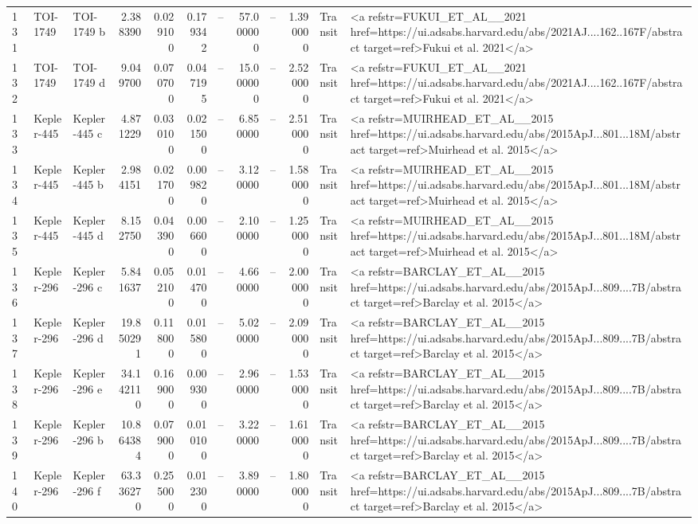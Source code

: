 \begin{tabular}{lllrrrrrrrll}
131 & TOI-1749 & TOI-1749 b & 2.388390 & 0.029100 & 0.179342 & -- & 57.000000 & -- & 1.390000 & Transit & <a refstr=FUKUI_ET_AL__2021 href=https://ui.adsabs.harvard.edu/abs/2021AJ....162..167F/abstract target=ref>Fukui et al. 2021</a> \\
132 & TOI-1749 & TOI-1749 d & 9.049700 & 0.070700 & 0.047195 & -- & 15.000000 & -- & 2.520000 & Transit & <a refstr=FUKUI_ET_AL__2021 href=https://ui.adsabs.harvard.edu/abs/2021AJ....162..167F/abstract target=ref>Fukui et al. 2021</a> \\
133 & Kepler-445 & Kepler-445 c & 4.871229 & 0.030100 & 0.021500 & -- & 6.850000 & -- & 2.510000 & Transit & <a refstr=MUIRHEAD_ET_AL__2015 href=https://ui.adsabs.harvard.edu/abs/2015ApJ...801...18M/abstract target=ref>Muirhead et al. 2015</a> \\
134 & Kepler-445 & Kepler-445 b & 2.984151 & 0.021700 & 0.009820 & -- & 3.120000 & -- & 1.580000 & Transit & <a refstr=MUIRHEAD_ET_AL__2015 href=https://ui.adsabs.harvard.edu/abs/2015ApJ...801...18M/abstract target=ref>Muirhead et al. 2015</a> \\
135 & Kepler-445 & Kepler-445 d & 8.152750 & 0.043900 & 0.006600 & -- & 2.100000 & -- & 1.250000 & Transit & <a refstr=MUIRHEAD_ET_AL__2015 href=https://ui.adsabs.harvard.edu/abs/2015ApJ...801...18M/abstract target=ref>Muirhead et al. 2015</a> \\
136 & Kepler-296 & Kepler-296 c & 5.841637 & 0.052100 & 0.014700 & -- & 4.660000 & -- & 2.000000 & Transit & <a refstr=BARCLAY_ET_AL__2015 href=https://ui.adsabs.harvard.edu/abs/2015ApJ...809....7B/abstract target=ref>Barclay et al. 2015</a> \\
137 & Kepler-296 & Kepler-296 d & 19.850291 & 0.118000 & 0.015800 & -- & 5.020000 & -- & 2.090000 & Transit & <a refstr=BARCLAY_ET_AL__2015 href=https://ui.adsabs.harvard.edu/abs/2015ApJ...809....7B/abstract target=ref>Barclay et al. 2015</a> \\
138 & Kepler-296 & Kepler-296 e & 34.142110 & 0.169000 & 0.009300 & -- & 2.960000 & -- & 1.530000 & Transit & <a refstr=BARCLAY_ET_AL__2015 href=https://ui.adsabs.harvard.edu/abs/2015ApJ...809....7B/abstract target=ref>Barclay et al. 2015</a> \\
139 & Kepler-296 & Kepler-296 b & 10.864384 & 0.079000 & 0.010100 & -- & 3.220000 & -- & 1.610000 & Transit & <a refstr=BARCLAY_ET_AL__2015 href=https://ui.adsabs.harvard.edu/abs/2015ApJ...809....7B/abstract target=ref>Barclay et al. 2015</a> \\
140 & Kepler-296 & Kepler-296 f & 63.336270 & 0.255000 & 0.012300 & -- & 3.890000 & -- & 1.800000 & Transit & <a refstr=BARCLAY_ET_AL__2015 href=https://ui.adsabs.harvard.edu/abs/2015ApJ...809....7B/abstract target=ref>Barclay et al. 2015</a> \\

\end{tabular}
